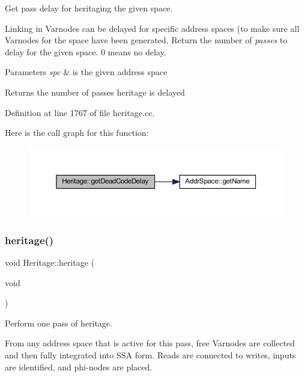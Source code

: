 Get pass delay for heritaging the given space. 

Linking in Varnodes can be delayed for specific address spaces (to make sure all Varnodes for the space have been generated. Return the number of {\itshape passes} to delay for the given space. 0 means no delay. 
\begin{DoxyParams}{Parameters}
{\em spc} & is the given address space \\
\hline
\end{DoxyParams}
\begin{DoxyReturn}{Returns}
the number of passes heritage is delayed 
\end{DoxyReturn}


Definition at line 1767 of file heritage.\+cc.

Here is the call graph for this function\+:
\nopagebreak
\begin{figure}[H]
\begin{center}
\leavevmode
\includegraphics[width=350pt]{class_heritage_a4f3d2a0674635a527b72ff6b96774f33_cgraph}
\end{center}
\end{figure}
\mbox{\label{class_heritage_ad710084ce475a863e5d5d800300e3fd8}} 
\subsubsection{\texorpdfstring{heritage()}{heritage()}}
{\footnotesize\ttfamily void Heritage\+::heritage (\begin{DoxyParamCaption}\item[{void}]{ }\end{DoxyParamCaption})}



Perform one pass of heritage. 

From any address space that is active for this pass, free Varnodes are collected and then fully integrated into S\+SA form. Reads are connected to writes, inputs are identified, and phi-\/nodes are placed. 

